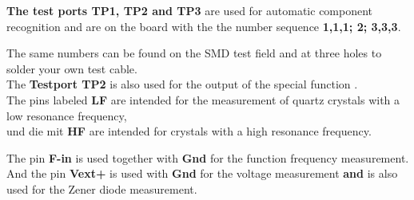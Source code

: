 \textbf {The test ports TP1, TP2 and TP3} are used for automatic component recognition
and are on the board with the the number sequence \textbf {1,1,1; 2; 3,3,3}.

The same numbers can be found on the SMD test field 
and at three holes to solder your own test cable.\\


The \textbf {Testport TP2} is also used for the output of the special function .\\
The pins labeled \textbf {LF} are intended for the measurement of quartz crystals with a low resonance frequency,
\\und die mit \textbf {HF} are intended for crystals with a high resonance frequency.

The pin \textbf {F-in} is used together with \textbf {Gnd} for the function frequency measurement.\\
And the pin \textbf {Vext+} is used with \textbf {Gnd} for the voltage measurement
\textbf {and} is also used for the Zener diode measurement.\\

